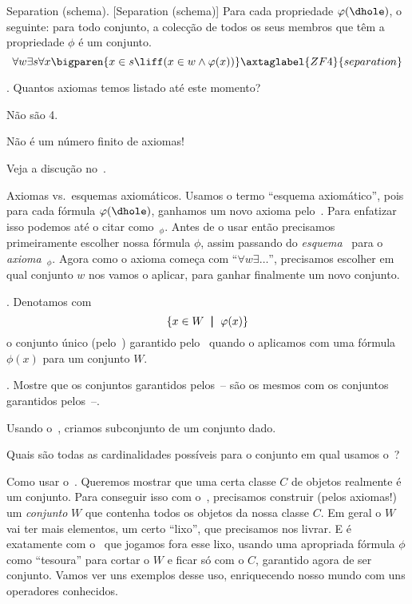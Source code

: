 \axiom Separation (schema).
[Separation (schema)]%
\label{separation}%
{\rm Para cada propriedade $\phi(\dhole)$, o seguinte:}
para todo conjunto, a colecção de todos os seus membros que têm a propriedade $\phi$ é um conjunto.
$$
\forall w
\exists s
\forall x
\bigparen{
x\in s
\liff
\paren{
x\in w 
\land
\phi(x)
}
}
\axtaglabel{ZF4}{separation}
$$

\exercise.
Quantos axiomas temos listado até este momento?

\hint
Não são 4.

\hint
Não é um número finito de axiomas!

\solution
Veja a discução no~.

\endexercise

\note Axiomas vs{.}~esquemas axiomáticos.
\label{axioms_vs_axiomatic_schemata}%
Usamos o termo ``esquema axiomático'', pois para cada fórmula $\phi(\dhole)$,
ganhamos um novo axioma pelo~.
Para enfatizar isso podemos até o citar como~$_{\phi}$.
Antes de o usar então precisamos primeiramente escolher nossa fórmula $\phi$, assim passando do \emph{esquema}~
para o \emph{axioma}~$_{\phi}$.
Agora como o axioma começa com ``$\forall w \exists \dots$'',
precisamos escolher em qual conjunto $w$ nos vamos o aplicar,
para ganhar finalmente um novo conjunto.

.
Denotamos com
$$
\left\{x \in W \ \;\mathord{\pmb{\mid}}\;\ \varphi(x)\right\}
$$
o conjunto único (pelo~) garantido pelo~ quando o aplicamos com uma fórmula $\phi(x)$ para um conjunto $W$.

\exercise.
\label{separation_yields_no_new_sets_yet}%
Mostre que os conjuntos garantidos pelos~--
são os mesmos com os conjuntos garantidos pelos~--.

\hint
Usando o~, criamos subconjunto de um conjunto dado.

\hint
Quais são todas as cardinalidades possíveis para o conjunto em qual
usamos o~?

\endexercise

\note Como usar o~.
Queremos mostrar que uma certa classe $C$ de objetos realmente é um conjunto.
Para conseguir isso com o~,
precisamos construir (pelos axiomas!) um \emph{conjunto}
$W$ que contenha todos os objetos da nossa classe $C$.
Em geral o $W$ vai ter mais elementos, um certo ``lixo'', que precisamos nos livrar.
E é exatamente com o~ que jogamos fora esse lixo,
usando uma apropriada fórmula $\phi$ como ``tesoura'' para cortar o $W$ e ficar só com o $C$,
garantido agora de ser conjunto.
Vamos ver uns exemplos desse uso,
enriquecendo nosso mundo com uns operadores conhecidos.


